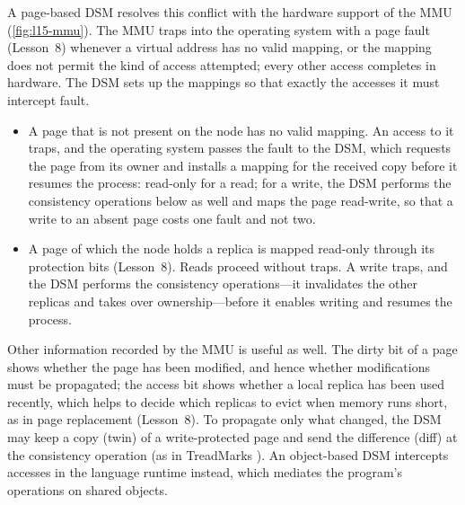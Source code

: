 \documentclass[../main.tex]{subfiles}
\begin{document}
A page-based DSM resolves this conflict with the hardware support of the
MMU (\cref{fig:l15-mmu}).  The MMU traps into the operating system with a
page fault (Lesson~8) whenever a virtual address has no
valid mapping, or the mapping does not permit the kind of access attempted;
every other access completes in hardware.  The DSM sets up the mappings so that exactly the accesses it must
intercept fault.
\begin{itemize}
  \item A page that is not present on the node has no valid mapping.  An
    access to it traps, and the operating system passes the fault to the
    DSM, which requests the page from its owner and installs a mapping for
    the received copy before it resumes the process: read-only for a read;
    for a write, the DSM performs the consistency operations below as well
    and maps the page read-write, so that a write to an absent page costs
    one fault and not two.
  \item A page of which the node holds a replica is mapped read-only
    through its protection bits (Lesson~8).  Reads
    proceed without traps.  A write traps, and the DSM performs the
    consistency operations---it invalidates the other replicas and takes
    over ownership---before it enables writing and resumes the
    process.
\end{itemize}
Other information recorded by the MMU is useful as well.  The dirty
bit of a page shows whether the page has been modified, and
hence whether modifications must be propagated; the access
bit shows whether a local replica has been used recently,
which helps to decide which replicas to evict when memory runs short, as
in page replacement (Lesson~8).  To propagate only what changed, the DSM may
keep a copy (twin) of a write-protected page and send the difference (diff)
at the consistency operation (as in TreadMarks \cite{keleher1994}).  An
object-based DSM intercepts accesses in the language runtime instead, which
mediates the program's operations on shared objects.
\end{document}
